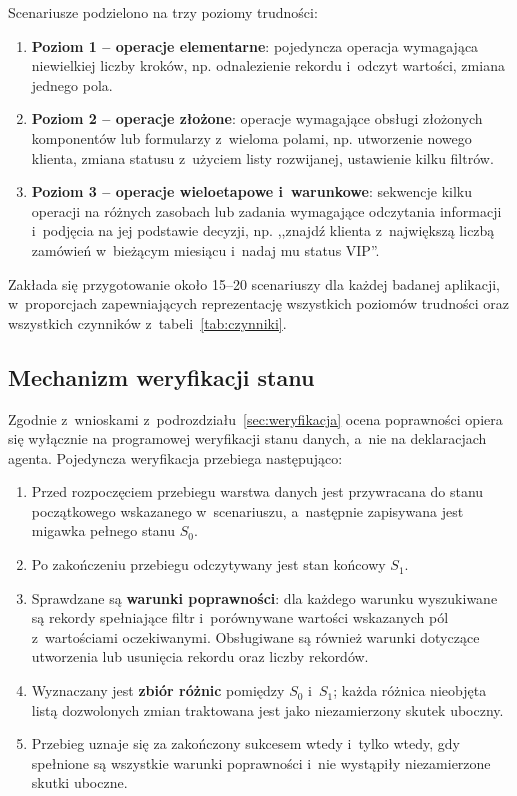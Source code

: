 Scenariusze podzielono na trzy poziomy trudności:
\begin{enumerate}
    \item \textbf{Poziom 1 -- operacje elementarne}: pojedyncza operacja wymagająca niewielkiej liczby kroków, np. odnalezienie rekordu i~odczyt wartości, zmiana jednego pola.
    \item \textbf{Poziom 2 -- operacje złożone}: operacje wymagające obsługi złożonych komponentów lub formularzy z~wieloma polami, np. utworzenie nowego klienta, zmiana statusu z~użyciem listy rozwijanej, ustawienie kilku filtrów.
    \item \textbf{Poziom 3 -- operacje wieloetapowe i~warunkowe}: sekwencje kilku operacji na różnych zasobach lub zadania wymagające odczytania informacji i~podjęcia na jej podstawie decyzji, np. ,,znajdź klienta z~największą liczbą zamówień w~bieżącym miesiącu i~nadaj mu status VIP''.
\end{enumerate}
Zakłada się przygotowanie około 15--20 scenariuszy dla każdej badanej aplikacji, w~proporcjach zapewniających reprezentację wszystkich poziomów trudności oraz wszystkich czynników z~tabeli~\ref{tab:czynniki}.

\subsection{Mechanizm weryfikacji stanu}
\label{sec:weryfikacja-projekt}
Zgodnie z~wnioskami z~podrozdziału~\ref{sec:weryfikacja} ocena poprawności opiera się wyłącznie na programowej weryfikacji stanu danych, a~nie na deklaracjach agenta. Pojedyncza weryfikacja przebiega następująco:
\begin{enumerate}
    \item Przed rozpoczęciem przebiegu warstwa danych jest przywracana do stanu początkowego wskazanego w~scenariuszu, a~następnie zapisywana jest migawka pełnego stanu $S_0$.
    \item Po zakończeniu przebiegu odczytywany jest stan końcowy $S_1$.
    \item Sprawdzane są \textbf{warunki poprawności}: dla każdego warunku wyszukiwane są rekordy spełniające filtr i~porównywane wartości wskazanych pól z~wartościami oczekiwanymi. Obsługiwane są również warunki dotyczące utworzenia lub usunięcia rekordu oraz liczby rekordów.
    \item Wyznaczany jest \textbf{zbiór różnic} pomiędzy $S_0$ i~$S_1$; każda różnica nieobjęta listą dozwolonych zmian traktowana jest jako niezamierzony skutek uboczny.
    \item Przebieg uznaje się za zakończony sukcesem wtedy i~tylko wtedy, gdy spełnione są wszystkie warunki poprawności i~nie wystąpiły niezamierzone skutki uboczne.
\end{enumerate}

